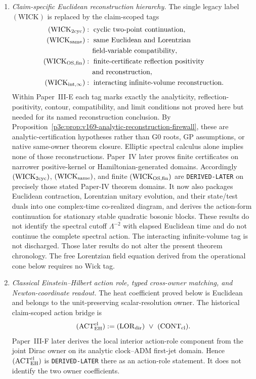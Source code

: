 \documentclass[12pt,a4paper]{article}
\begin{document}
\begin{definition}
\begin{enumerate}[label=(\roman*)]
\item \emph{Claim-specific Euclidean reconstruction hierarchy.}
The single legacy label \((\mathrm{WICK})\) is replaced by the
claim-scoped tags
\[
\begin{aligned}
(\mathrm{WICK}_{2{\rm cyc}})&:\ \text{cyclic two-point continuation},\\
(\mathrm{WICK}_{\rm same})&:\ \text{same Euclidean and Lorentzian}\\
&\hspace{1em}\text{field-variable compatibility},\\
(\mathrm{WICK}_{\rm OS,fin})&:\ \text{finite-certificate reflection positivity}\\
&\hspace{1em}\text{and reconstruction},\\
(\mathrm{WICK}_{\rm int,\infty})&:\ \text{interacting infinite-volume reconstruction.}
\end{aligned}
\]
Within Paper~III-E each tag marks exactly the analyticity,
reflection-positivity, contour, compatibility, and limit conditions not proved
here but needed for its named reconstruction conclusion.  By
Proposition~\ref{p3e:prop:v169-analytic-reconstruction-firewall}, these are
analytic-certification hypotheses rather than G0 roots, GP assumptions, or
native same-owner theorem closure.  Elliptic spectral calculus alone implies
none of those reconstructions.  Paper~IV later proves
finite certificates on narrower positive-kernel or Hamiltonian-generated
domains.  Accordingly \((\mathrm{WICK}_{2{\rm cyc}})\),
\((\mathrm{WICK}_{\rm same})\), and finite
\((\mathrm{WICK}_{\rm OS,fin})\) are \texttt{DERIVED-LATER} on precisely
those stated Paper-IV theorem domains.  It now also packages Euclidean
contraction, Lorentzian unitary evolution, and their state/test duals into one
complex-time co-realized diagram, and derives the action-form continuation for
stationary stable quadratic bosonic blocks.  These results do not identify the
spectral cutoff \(\Lambda^{-2}\) with elapsed Euclidean time and do not
continue the complete spectral action.  The interacting infinite-volume tag
is not discharged.  Those later results do not alter the present theorem
chronology.  The free Lorentzian field equation derived from the operational
cone below requires no Wick tag.

\item \emph{Classical Einstein--Hilbert action role, typed cross-owner
matching, and Newton-coordinate readout.}
The heat coefficient proved below is Euclidean and belongs to the
unit-preserving scalar-resolution owner.  The historical claim-scoped action
bridge is
\[
 (\mathrm{ACT}_{\rm EH}^{\rm cl})
 :=(\mathrm{LOR}_{\rm dir})\ \vee\ (\mathrm{CONT}_{\rm cl}).
\]
Paper~III-F later derives the local interior action-role component from the
joint Dirac owner on its analytic clock--ADM first-jet domain.  Hence
\((\mathrm{ACT}_{\rm EH}^{\rm cl})\) is \texttt{DERIVED-LATER} there as an
action-role statement.  It does not identify the two owner coefficients.


\end{enumerate}
\end{definition}
\end{document}
